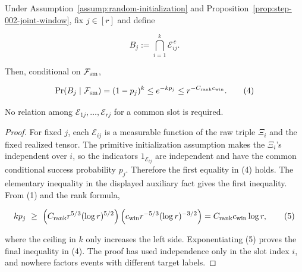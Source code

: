 \begin{lemma}\label{lem:step-003-slot-miss}
Under Assumption~\ref{assump:random-initialization} and
Proposition~\ref{prop:step-002-joint-window}, fix \(j\in[r]\) and define

\[
B_j:=\bigcap_{i=1}^k\mathscr E_{ij}^{\,c}.
\tag{3}
\]

Then, conditional on \(\mathcal F_{\rm sm}\),

\[
\Pr(B_j\mid\mathcal F_{\rm sm})=(1-p_j)^k
\le e^{-kp_j}
\le r^{-C_{\rm rank}c_{\rm win}}.
\tag{4}
\]

No relation among \(\mathscr E_{1j},\ldots,\mathscr E_{rj}\) for a common
slot is required.

\begin{proof}
For fixed \(j\), each \(\mathscr E_{ij}\) is a measurable function of the
raw triple \(\Xi_i\) and the fixed realized tensor. The primitive
initialization assumption makes the \(\Xi_i\)'s independent over \(i\), so
the indicators \(1_{\mathscr E_{ij}}\) are independent and have the common
conditional success probability \(p_j\). Therefore the first equality in
(4) holds. The elementary inequality in the displayed auxiliary fact gives the first
inequality. From (1) and the rank formula,

\[
kp_j\ \ge\ \left(C_{\rm rank}r^{5/3}(\log r)^{5/2}\right)
   \left(c_{\rm win}r^{-5/3}(\log r)^{-3/2}\right)
 =C_{\rm rank}c_{\rm win}\log r,
\tag{5}
\]

where the ceiling in \(k\) only increases the left side. Exponentiating
(5) proves the final inequality in (4). The proof has used independence
only in the slot index \(i\), and nowhere factors events with different
target labels. 


\end{proof}
\end{lemma}
